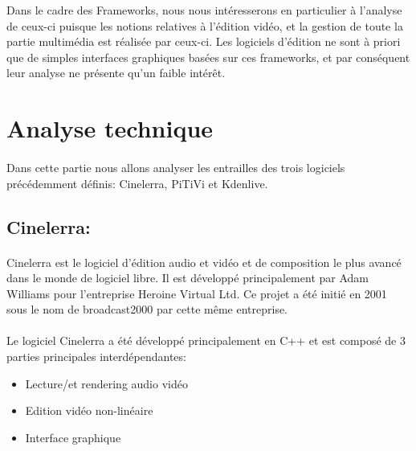 {Dans le cadre des Frameworks, nous nous intéresserons
en particulier à l'analyse de ceux-ci puisque les notions relatives
à l'édition vidéo, et la gestion de toute la partie multimédia est
réalisée par ceux-ci. Les logiciels d'édition ne sont à priori que
de simples interfaces graphiques basées sur ces frameworks, et par
conséquent leur analyse ne présente qu'un faible intérêt.

\newpage \section{Analyse technique}

\paragraph {}

Dans cette partie nous allons analyser les entrailles des trois logiciels précédemment
définis: Cinelerra, PiTiVi et Kdenlive.

\subsection{Cinelerra:}

\paragraph {}

Cinelerra est le logiciel d'édition audio et vidéo et de composition le plus
avancé dans le monde de logiciel libre. Il est développé principalement par
Adam Williams pour l'entreprise Heroine Virtual Ltd. Ce projet a été initié
en 2001 sous le nom de broadcast2000 par cette même entreprise.

\paragraph{}

Le logiciel Cinelerra a été développé principalement en C++ et est composé de 3 parties
principales interdépendantes:

\begin{itemize}

  \item{Lecture/et rendering audio vidéo}

  \item{Edition vidéo non-linéaire}

  \item{Interface graphique}


\end{itemize}}
